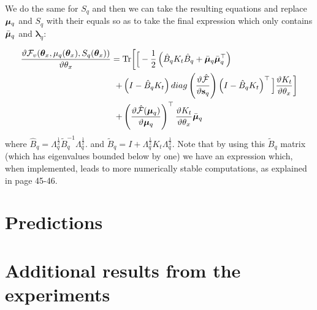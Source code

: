 We do the same for $S_q$ and then we can take the resulting equations
and replace $\boldsymbol \mu_q$ and $S_q$ with their equals so as to take the
final expression which only contains $\bar{\boldsymbol \mu}_q$ and $\boldsymbol
\lambda_q$:

\begin{align}
\frac{\vartheta \mathcal{F}_v(\boldsymbol \theta_x, \mu_q(\boldsymbol \theta_x), S_q(\boldsymbol \theta_x))}{\vartheta \theta_x}
={}& \text{Tr} \bigg[
\Big[ - \frac{1}{2} \left( \hat{B}_q K_t \hat{B}_q + \bar{\boldsymbol \mu}_q \bar{\boldsymbol \mu}_q^\top \right) \nonumber \\
+{}& \left( I - \hat{B}_q K_t \right)
 diag \left(  \frac{\vartheta \hat{\mathcal{F}}}{\vartheta \mathbf{s}_q} \right)
			 \left( I - \hat{B}_q K_t \right)^\top \Big]
			  \frac{\vartheta K_t}{\vartheta \theta_x} \bigg] 	\nonumber \\	
+{}&  \left( \frac{\vartheta \hat{\mathcal{F}}( \boldsymbol \mu_q)}{\vartheta \boldsymbol \mu_q} \right)^\top
					\frac{\vartheta K_t}{\vartheta \theta_x} \bar{\boldsymbol \mu}_q 
\label{CompleteBoundDerivThetatB}
\end{align}
where $\hat{B}_q = \Lambda_q^{\frac{1}{2}} \widetilde{B}_q^{-1} \Lambda_q^{\frac{1}{2}}$.
and $\tilde{B}_q = I + \Lambda_q^{\frac{1}{2}} K_t \Lambda_q^{\frac{1}{2}}$. Note that by using this
$\tilde{B}_q$ matrix (which has eigenvalues bounded below by one) we have an expression which, when implemented, leads to more numerically stable computations, as explained in \cite{rasmussen-williams} page 45-46. 




\section{Predictions}


\section{Additional results from the experiments}

